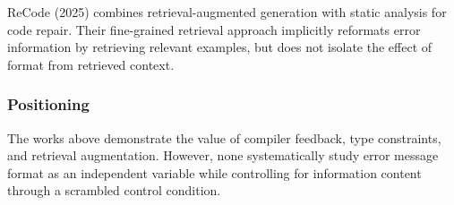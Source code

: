 ReCode (2025) combines retrieval-augmented generation with static analysis for code repair. Their fine-grained retrieval approach implicitly reformats error information by retrieving relevant examples, but does not isolate the effect of format from retrieved context.

\subsubsection{Positioning}

The works above demonstrate the value of compiler feedback, type constraints, and retrieval augmentation. However, none systematically study error message format as an independent variable while controlling for information content through a scrambled control condition.
